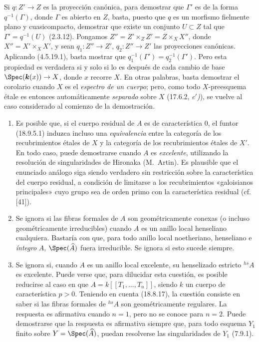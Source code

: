 Si $q:Z'\to Z$ es la proyección canónica, para demostrar que $\Gamma'$ es de la forma $q^{-1}(\Gamma)$, donde $\Gamma$ es abierto en $Z$, basta, puesto que $q$ es un morfismo fielmente plano y cuasicompacto, demostrar que existe un conjunto $U\subset Z$ tal que $\Gamma'=q^{-1}(U)$ (2.3.12). Pongamos $Z''=Z'\times_Z Z'=Z\times_X X''$, donde $X''=X'\times_X X'$, y sean $q_1:Z''\to Z'$, $q_2:Z''\to Z'$ las proyecciones canónicas. Aplicando (4.5.19.1), basta mostrar que $q_1^{-1}(\Gamma')=q_2^{-1}(\Gamma')$. Pero esta propiedad es verdadera si y solo si lo es después de cada cambio de base $\Spec(\boldsymbol k(x))\to X$, donde $x$ recorre $X$. En otras palabras, basta demostrar el corolario cuando $X$ es el \emph{espectro de un cuerpo}; pero, como todo $X$-preesquema étale es entonces automáticamente \emph{separado} sobre $X$ (17.6.2, \emph{c$'$)}), se vuelve al caso considerado al comienzo de la demostración.

\begin{remarks}[18.9.6]
\label{IV.18.9.6}
\begin{enumerate}
  \item[(i)] Es posible que, si el cuerpo residual de $A$ es de característica 0, el funtor (18.9.5.1) induzca incluso una \emph{equivalencia} entre la categoría de los recubrimientos étales de $X$ y la categoría de los recubrimientos étales de $X'$. En todo caso, puede demostrarse cuando $A$ es \emph{excelente}, utilizando la resolución de singularidades de Hironaka (M.~Artin). Es plausible que el enunciado análogo siga siendo verdadero sin restricción sobre la característica del cuerpo residual, a condición de limitarse a los recubrimientos «galoisianos principales» cuyo grupo sea de orden primo con la característica residual (cf. [41]).


  \item[(ii)] Se ignora si las fibras formales de $A$ son geométricamente conexas (o incluso geométricamente irreducibles) cuando $A$ es un anillo local henseliano cualquiera. Bastaría con que, para todo anillo local noetheriano, henseliano e \emph{íntegro} $A$, $\Spec(\widehat A)$ fuera irreducible. Se ignora si esto sucede siempre.

  \item[(iii)] Se ignora si, cuando $A$ es un anillo local excelente, su henselizado estricto ${}^{hs}\!A$ es excelente. Puede verse que, para dilucidar esta cuestión, es posible reducirse al caso en que $A=k[[T_1,\ldots,T_n]]$, siendo $k$ un cuerpo de característica $p>0$. Teniendo en cuenta (18.8.17), la cuestión consiste en saber si las fibras formales de ${}^{hs}\!A$ son geométricamente regulares. La respuesta es afirmativa cuando $n=1$, pero no se conoce para $n=2$. Puede demostrarse que la respuesta es afirmativa siempre que, para todo esquema $Y_1$ finito sobre $Y=\Spec(\widehat A)$, puedan resolverse las singularidades de $Y_1$ (7.9.1).
\end{enumerate}
\end{remarks}

